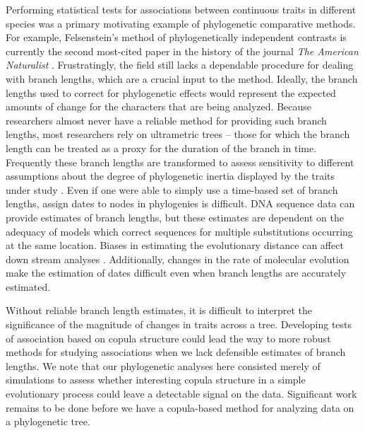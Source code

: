 

Performing statistical tests for associations between continuous traits in different species
    was a primary motivating example of phylogenetic comparative methods.
For example, Felsenstein's method of phylogenetically independent contrasts 
    \citep{Felsenstein1985} is currently the second most-cited paper in the history
    of the journal {\em The American Naturalist} \citep{HueyGT2019}.
Frustratingly, the field still lacks a dependable procedure for dealing with branch lengths, 
    which are a crucial input to the method.
Ideally, the branch lengths used to correct for phylogenetic effects would represent
    the expected amounts of change for the characters that are being analyzed.
Because researchers almost never have a reliable method for providing such branch lengths,
    most researchers rely on ultrametric trees -- those for which the branch
    length can be treated as a proxy for the duration of the branch in time.
Frequently these branch lengths are transformed to assess sensitivity to different 
    assumptions about the degree of phylogenetic inertia displayed by the traits
    under study \citep[See recent reviews, ][]{Ives2018,Harmon2018}.
Even if one were able to simply use a time-based set of branch lengths, assign
    dates to nodes in phylogenies is difficult.
DNA sequence data can provide estimates of branch lengths, but these estimates
    are dependent on the adequacy of models which correct sequences for multiple
    substitutions occurring at the same location.
Biases in estimating the evolutionary distance can affect down stream analyses \citep[See][]{Phillips2009}.
Additionally, changes
    in the rate of molecular evolution make the estimation of dates difficult \citep[See][]{HeathM2014} even when branch lengths are accurately estimated.

Without reliable branch length estimates, it is difficult to interpret the significance
    of the magnitude of changes in traits across a tree.
Developing tests of association based on copula structure could lead the way to more
    robust methods for studying associations when we lack defensible estimates of
    branch lengths.
We note that our phylogenetic analyses here consisted merely of simulations to assess
    whether interesting copula structure in a simple evolutionary process could 
    leave a detectable signal on the data.
Significant work remains to be done before we have a copula-based method for 
    analyzing data on a phylogenetic tree.

